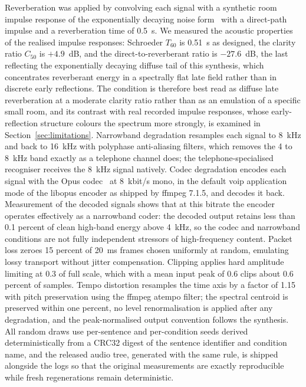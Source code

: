 Reverberation was applied by convolving each signal with a synthetic room
impulse response of the exponentially decaying noise
form~\citep{allen1979image,habets2006room} with a direct-path impulse and a
reverberation time of 0.5~s. We measured the acoustic properties of the
realised impulse responses: Schroeder $T_{60}$ is 0.51~s as designed, the
clarity ratio $C_{50}$ is $+4.9$~dB, and the direct-to-reverberant ratio is
$-27.6$~dB, the last reflecting the exponentially decaying diffuse tail of
this synthesis, which concentrates reverberant energy in a spectrally flat
late field rather than in discrete early reflections. The condition is
therefore best read as diffuse late reverberation at a moderate clarity
ratio rather than as an emulation of a specific small room, and its contrast
with real recorded impulse responses, whose early-reflection structure
colours the spectrum more strongly, is examined in
Section~\ref{sec:limitations}. Narrowband degradation resamples each
signal to 8~kHz and back to 16~kHz with polyphase anti-aliasing filters,
which removes the 4 to 8~kHz band exactly as a telephone channel does; the
telephone-specialised recogniser receives the 8~kHz signal natively. Codec
degradation encodes each signal with the Opus codec~\citep{valin2012definition}
at 8~kbit/s mono, in the default voip application mode of the libopus
encoder as shipped by ffmpeg 7.1.5, and decodes it back. Measurement of the
decoded signals shows that at this bitrate the encoder operates effectively
as a narrowband coder: the decoded output retains less than 0.1 percent of
clean high-band energy above 4~kHz, so the codec and narrowband conditions
are not fully independent stressors of high-frequency content. Packet loss
zeroes 15 percent of 20~ms frames chosen uniformly at random, emulating
lossy transport without jitter compensation. Clipping applies hard amplitude
limiting at 0.3 of full scale, which with a mean input peak of 0.6 clips
about 0.6 percent of samples. Tempo distortion resamples the time axis by a
factor of 1.15 with pitch preservation using the ffmpeg atempo filter; the
spectral centroid is preserved within one percent, no level renormalisation
is applied after any degradation, and the peak-normalised output convention
follows the synthesis. All random draws use per-sentence and per-condition
seeds derived deterministically from a CRC32 digest of the sentence
identifier and condition name, and the released audio tree, generated with
the same rule, is shipped alongside the logs so that the original
measurements are exactly reproducible while fresh regenerations remain
deterministic.

